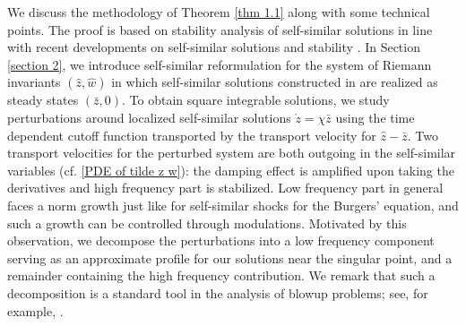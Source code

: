 \documentclass{article}
\numberwithin{equation}{section}
\begin{document}
We discuss the methodology of Theorem \ref{thm 1.1} along with some technical points.  The proof is based on 
stability analysis of self-similar solutions in line with recent developments on self-similar solutions and stability \cite{Buckmaster22,CGN18,CRS19,DM19, GHJS25, LWZ25, Merle97, Merle22b,OhPasqualotto24}. In Section \ref{section 2}, we introduce self-similar reformulation for the system of Riemann invariants $(\hat z, \hat w)$ in which self-similar solutions constructed in \cite{JLN2025} are realized as steady states $(\bar z, 0)$. To obtain square integrable solutions, we study perturbations around localized self-similar solutions $\mathring z = \chi \bar z $ using the time dependent cutoff function transported by the transport velocity for $\hat z - \bar z$. Two transport velocities for the perturbed system are both outgoing in the self-similar variables (cf. \eqref{PDE of tilde z w}): the damping effect is amplified upon taking the derivatives and high frequency part is stabilized. Low frequency part in general faces a norm growth just like for self-similar shocks for the Burgers’ equation, and such a growth can be controlled through modulations. 
Motivated by this observation, we decompose the perturbations into a low frequency component serving as an approximate profile for our solutions near the singular point, and a remainder containing the high frequency contribution. We remark that such a decomposition is a standard tool in the analysis of blowup problems; see, for example, \cite{Buckmaster22,CGN18,CRS19,Merle97,OhPasqualotto24}. 
\end{document}
